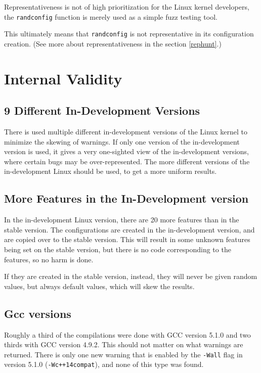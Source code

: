 \documentclass[a4paper,11pt]{report}
\begin{document}
Representativeness is not of high prioritization for the Linux kernel 
developers, the \texttt{randconfig} function is merely used as a simple fuzz 
testing tool.

This ultimately means that \texttt{randconfig} is not representative in its 
configuration creation. (See more about representativeness in the section 
\ref{rephunt}.)
\\



            \section{Internal Validity}
            \label{sec:intval}


            \subsection{9 Different In-Development Versions}
There is used multiple different in-development versions of the Linux kernel to 
minimize the skewing of warnings. If only one version of the in-development 
version is used, it gives a very one-sighted view of the in-development 
versions, where certain bugs may be over-represented. The more different 
versions of the in-development Linux should be used, to get a more uniform 
results.


            \subsection{More Features in the In-Development version}
In the in-development Linux version, there are 20 more features than in the 
stable version. The configurations are created in the in-development version, 
and are copied over to the stable version. This will result in some unknown 
features being set on the stable version, but there is no code corresponding to 
the features, so no harm is done.

If they are created in the stable version, instead, they will never be given 
random values, but always default values, which will skew the results.
\\


            \subsection{Gcc versions}
Roughly a third of the compilations were done with GCC version 5.1.0 and two 
thirds with GCC version 4.9.2. This should not matter on what warnings are 
returned. There is only one new warning that is enabled by the \texttt{-Wall} 
flag in version 5.1.0 (\texttt{-Wc++14compat}), and none of this type was found.
\\
\end{document}
